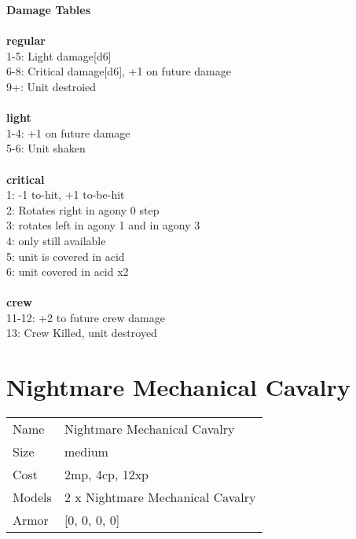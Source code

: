 {\bf Damage Tables} \\
\ \\ {\bf regular } \\
1-5: Light damage[d6] \\
6-8: Critical damage[d6], +1 on future damage \\
9+: Unit destroied \\
\ \\ {\bf light } \\
1-4: +1 on future damage \\
5-6: Unit shaken \\
\ \\ {\bf critical } \\
1: -1 to-hit, +1 to-be-hit \\
2: Rotates right in agony 0 step \\
3: rotates left in agony 1 and in agony 3 \\
4: only still available \\
5: unit is covered in acid \\
6: unit covered in acid x2 \\
\ \\ {\bf crew } \\
11-12: +2 to future crew damage \\
13: Crew Killed, unit destroyed \\










\pagebreak\pagebreak

\section{ Nightmare Mechanical Cavalry }

\begin{tabular}{ll}
  Name & Nightmare Mechanical Cavalry \\
  Size & medium\\
  Cost & 2mp, 4cp, 12xp\\
  Models & 2 x Nightmare Mechanical Cavalry\\
  Armor & [0, 0, 0, 0]\\
\end{tabular}

\noindent 

